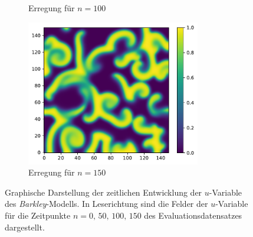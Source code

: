 \begin{appendices}
\begin{figure}[h]
\begin{subfigure}{.5\textwidth}
		\setcapmargin[1cm]{0.5cm}
		\caption{Erregung für $n=100$}
	\end{subfigure}%
	\begin{subfigure}{.5\textwidth}
		\centering
		\includegraphics[height=2.5in]{figures/results/dynamics/barkley_150.pdf}
		\setcapmargin[1cm]{0.5cm}
		\caption{Erregung für $n=150$}
	\end{subfigure}
	\caption{Graphische Darstellung der zeitlichen Entwicklung der $u$-Variable des \textit{Barkley}-Modells. In Leserichtung sind die Felder der $u$-Variable für die Zeitpunkte $n=0,\, 50,\, 100,\, 150$ des Evaluationsdatensatzes dargestellt.}
	\label{fig:apx_barkley_evolution}
\end{figure} 


\end{appendices}
